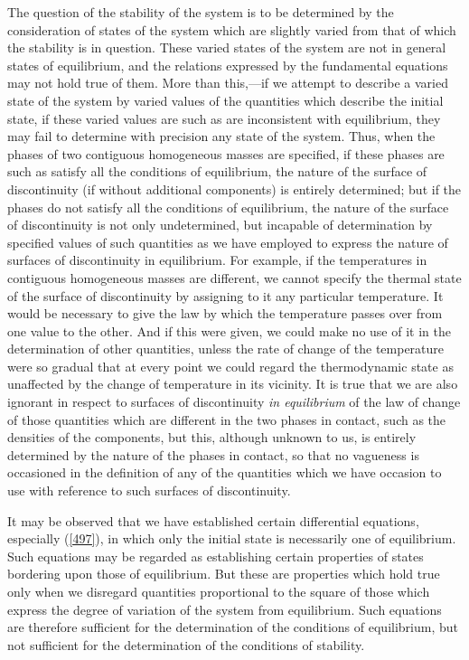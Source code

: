 \documentclass[12pt]{article}
\begin{document}
{The question of the stability of the system is to be determined by the consideration of states of the system which are slightly varied from that of which the stability is in question. These varied states of the system are not in general states of equilibrium, and the relations expressed by the fundamental equations may not hold true of them. More than this,---if we attempt to describe a varied state of the system by varied values of the quantities which describe the initial state, if these varied values are such as are inconsistent with equilibrium, they may fail to determine with precision any state of the system. Thus, when the phases of two contiguous homogeneous masses are specified, if these phases are such as satisfy all the conditions of equilibrium, the nature of the surface of discontinuity (if without additional components) is entirely determined; but if the phases do not satisfy all the conditions of equilibrium, the nature of the surface of discontinuity is not only undetermined, but incapable of determination by specified values of such quantities as we have employed to express the nature of surfaces of discontinuity in equilibrium. For example, if the temperatures in contiguous homogeneous masses are different, we cannot specify the thermal state of the surface of discontinuity by assigning to it any particular temperature. It would be necessary to give the law by which the temperature passes over from one value to the other. And if this were given, we could make no use of it in the determination of other quantities, unless the rate of change of the temperature were so gradual that at every point we could regard the thermodynamic state as unaffected by the change of temperature in its vicinity. It is true that we are also ignorant in respect to surfaces of discontinuity \textit{in equilibrium} of the law of change of those quantities which are different in the two phases in contact, such as the densities of the components, but this, although unknown to us, is entirely determined by the nature of the phases in contact, so that no vagueness is occasioned in the definition of any of the quantities which we have occasion to use with reference to such surfaces of discontinuity.

It may be observed that we have established certain differential equations, especially (\ref{497}), in which only the initial state is necessarily one of equilibrium. Such equations may be regarded as establishing certain properties of states bordering upon those of equilibrium. But these are properties which hold true only when we disregard quantities proportional to the square of those which express the degree of variation of the system from equilibrium. Such equations are therefore sufficient for the determination of the conditions of equilibrium, but not sufficient for the determination of the conditions of stability.

}
\end{document}
